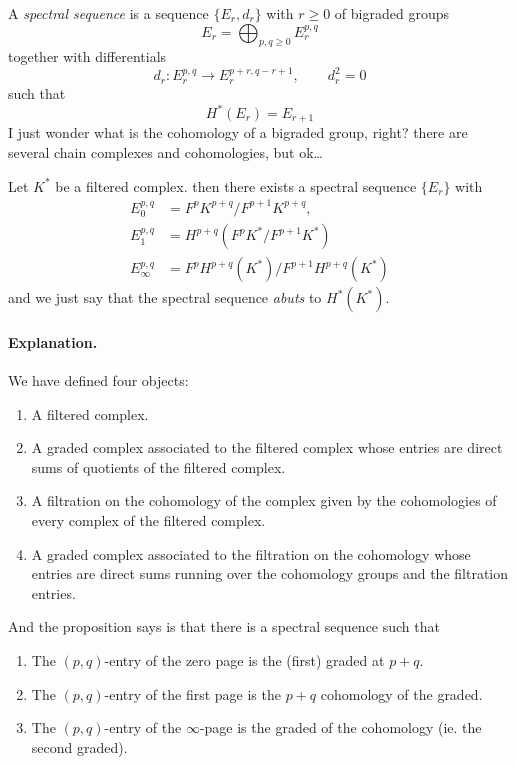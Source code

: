 \begin{definition}
\label{definition-spect-seque-seque-e-r}
	A {\it spectral sequence} is a sequence
	$\{E_r,d_r\}$ with $r\geq 0$ of bigraded
	groups
	$$E_r=\bigoplus_{p,q\geq 0} E^{p,q}_r $$
together with differentials
$$d_r:E^{p,q}_r\to E^{p+r,q-r+1}_r,\qquad
d^2_r=0$$
such that
$$H^{*}(E_r)=E_{r+1}$$
I just wonder what is the cohomology of a
bigraded group, right? there are several
chain complexes and cohomologies, but ok…
\end{definition}

\begin{proposition}
\label{proposition-exist-descr-chain-compl}
	Let $K^*$ be a filtered complex. then there
	exists a spectral sequence $\{E_r\}$ with
	$$
\begin{aligned}
		E^{p,q}_0&=F^pK^{p+q}/F^{p+1}K^{p+q},\\
		E^{p,q}_1&=H^{p+q}\left( F^pK^*/F^{p+1}K^*
		\right)\\
		E^{p,q}_{\infty}&=F^pH^{p+q}(K^*)\big/F^{p+1}
		H^{p+q}(K^*)
	\end{aligned}
$$
and we just say that the spectral sequence
{\it abuts} to $H^{*}(K^*)$.
\end{proposition}

\paragraph{Explanation.} We have defined four
objects:
\begin{enumerate}
	\item A filtered complex.
	\item A graded complex associated to the
	filtered complex whose entries are direct
	sums of quotients of the filtered complex.
	\item A filtration on the cohomology of the
	complex given by the cohomologies of every
	complex of the filtered complex.
	\item A graded complex associated to the
	filtration on the cohomology whose entries
	are direct sums running over the cohomology
	groups and the filtration entries.
\end{enumerate}
And the proposition says is that there is a
spectral sequence such that
\begin{enumerate}
	\item The $(p,q)$-entry of the zero page is
	the (first) graded at $p+q$.
	\item The $(p,q)$-entry of the first page is
	the $p+q$ cohomology of the graded.
	\item The $(p,q)$-entry of the $\infty$-page
	is the graded of the cohomology
 (ie. the second graded).
\end{enumerate}

